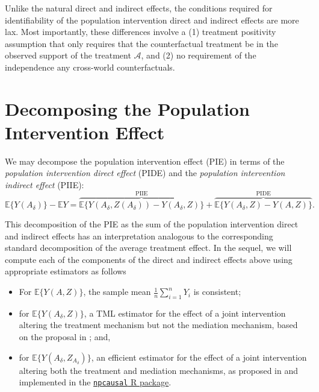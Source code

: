 \documentclass[
  12pt, krantz2,
]{krantz}
\newcommand{\passthrough}[1]{#1}
\providecommand{\tightlist}{%
  \setlength{\itemsep}{0pt}\setlength{\parskip}{0pt}}
\theoremstyle{definition}
\theoremstyle{definition}
\theoremstyle{definition}
\newcommand{\1}{\mathbbm{1}}
\begin{document}
Unlike the natural direct and indirect effects, the conditions required for
identifiability of the population intervention direct and indirect effects are
more lax. Most importantly, these differences involve a (1) treatment positivity
assumption that only requires that the counterfactual treatment be in the
observed support of the treatment \(\mathcal{A}\), and (2) no requirement of the
independence any cross-world counterfactuals.

\hypertarget{decomposing-the-population-intervention-effect}{%
\section{Decomposing the Population Intervention Effect}\label{decomposing-the-population-intervention-effect}}

We may decompose the population intervention effect (PIE) in terms of the
\emph{population intervention direct effect} (PIDE) and the \emph{population
intervention indirect effect} (PIIE):
\begin{equation*}
  \mathbb{E}\{Y(A_\delta)\} - \mathbb{E}Y =
    \overbrace{\mathbb{E}\{Y(A_\delta, Z(A_\delta))
      - Y(A_\delta, Z)\}}^{\text{PIIE}} +
    \overbrace{\mathbb{E}\{Y(A_\delta, Z) - Y(A, Z)\}}^{\text{PIDE}}.
\end{equation*}

This decomposition of the PIE as the sum of the population intervention direct
and indirect effects has an interpretation analogous to the corresponding
standard decomposition of the average treatment effect. In the sequel, we will
compute each of the components of the direct and indirect effects above using
appropriate estimators as follows

\begin{itemize}
\tightlist
\item
  For \(\mathbb{E}\{Y(A, Z)\}\), the sample mean \(\frac{1}{n}\sum_{i=1}^n Y_i\) is
  consistent;
\item
  for \(\mathbb{E}\{Y(A_{\delta}, Z)\}\), a TML estimator for the effect of a
  joint intervention altering the treatment mechanism but not the mediation
  mechanism, based on the proposal in \citet{diaz2020causal}; and,
\item
  for \(\mathbb{E}\{Y(A_{\delta}, Z_{A_{\delta}})\}\), an efficient estimator for
  the effect of a joint intervention altering both the treatment and mediation
  mechanisms, as proposed in \citet{kennedy2017nonparametric} and implemented in the
  \href{https://github.com/ehkennedy/npcausal}{\passthrough{\lstinline!npcausal!} R package}.
\end{itemize}
\end{document}
